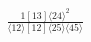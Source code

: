 \documentclass[varwidth, border=5pt]{standalone}
\begin{document}
\begin{my}
$\begin{gathered}
\scriptscriptstyle\frac{1[13]⟨24⟩^2}{⟨12⟩[12]⟨25⟩⟨45⟩}
\end{gathered}$
\end{my}
\end{document}
